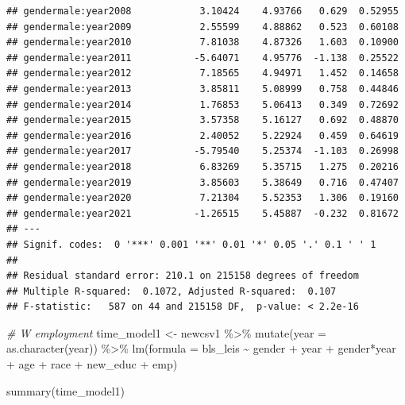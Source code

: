 \documentclass[
]{article}
\newenvironment{Shaded}{\begin{snugshade}}{\end{snugshade}}
\newcommand{\AttributeTok}[1]{\textcolor[rgb]{0.77,0.63,0.00}{#1}}
\newcommand{\CommentTok}[1]{\textcolor[rgb]{0.56,0.35,0.01}{\textit{#1}}}
\newcommand{\FunctionTok}[1]{\textcolor[rgb]{0.00,0.00,0.00}{#1}}
\newcommand{\NormalTok}[1]{#1}
\newcommand{\OtherTok}[1]{\textcolor[rgb]{0.56,0.35,0.01}{#1}}
\newcommand{\SpecialCharTok}[1]{\textcolor[rgb]{0.00,0.00,0.00}{#1}}
\begin{document}
\begin{verbatim}
## gendermale:year2008            3.10424    4.93766   0.629  0.52955    
## gendermale:year2009            2.55599    4.88862   0.523  0.60108    
## gendermale:year2010            7.81038    4.87326   1.603  0.10900    
## gendermale:year2011           -5.64071    4.95776  -1.138  0.25522    
## gendermale:year2012            7.18565    4.94971   1.452  0.14658    
## gendermale:year2013            3.85811    5.08999   0.758  0.44846    
## gendermale:year2014            1.76853    5.06413   0.349  0.72692    
## gendermale:year2015            3.57358    5.16127   0.692  0.48870    
## gendermale:year2016            2.40052    5.22924   0.459  0.64619    
## gendermale:year2017           -5.79540    5.25374  -1.103  0.26998    
## gendermale:year2018            6.83269    5.35715   1.275  0.20216    
## gendermale:year2019            3.85603    5.38649   0.716  0.47407    
## gendermale:year2020            7.21304    5.52353   1.306  0.19160    
## gendermale:year2021           -1.26515    5.45887  -0.232  0.81672    
## ---
## Signif. codes:  0 '***' 0.001 '**' 0.01 '*' 0.05 '.' 0.1 ' ' 1
## 
## Residual standard error: 210.1 on 215158 degrees of freedom
## Multiple R-squared:  0.1072, Adjusted R-squared:  0.107 
## F-statistic:   587 on 44 and 215158 DF,  p-value: < 2.2e-16
\end{verbatim}

\begin{Shaded}
\begin{Highlighting}[]
\CommentTok{\# W employment}
\NormalTok{time\_model1 }\OtherTok{\textless{}{-}}\NormalTok{ newcsv1 }\SpecialCharTok{\%\textgreater{}\%}
  \FunctionTok{mutate}\NormalTok{(}\AttributeTok{year =} \FunctionTok{as.character}\NormalTok{(year)) }\SpecialCharTok{\%\textgreater{}\%}
  \FunctionTok{lm}\NormalTok{(}\AttributeTok{formula =}\NormalTok{ bls\_leis }\SpecialCharTok{\textasciitilde{}}\NormalTok{ gender }\SpecialCharTok{+}\NormalTok{ year }\SpecialCharTok{+}\NormalTok{ gender}\SpecialCharTok{*}\NormalTok{year }\SpecialCharTok{+}\NormalTok{ age }\SpecialCharTok{+}\NormalTok{ race }\SpecialCharTok{+}\NormalTok{ new\_educ }\SpecialCharTok{+}\NormalTok{ emp) }

\FunctionTok{summary}\NormalTok{(time\_model1)}
\end{Highlighting}
\end{Shaded}
\end{document}
